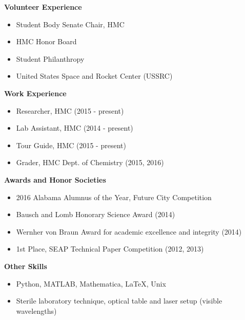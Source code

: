 \documentclass[9pt]{article}
\begin{document}
\begin{multicols*}{2}

\noindent
{\bf Volunteer Experience \\}
\vspace{-8mm}
	\begin{itemize}[leftmargin=3.75mm]
		\setlength{\itemsep}{0pt}
    	\setlength{\parskip}{0pt}
    	\setlength{\parsep}{0pt}
		\item Student Body Senate Chair, HMC
		\item HMC Honor Board
		\item Student Philanthropy
		\item United States Space and Rocket Center (USSRC)
	\end{itemize}

\noindent
{\bf Work Experience \\}
\vspace{-8mm}
	\begin{itemize}[leftmargin=3.75mm]
		\setlength{\itemsep}{0pt}
    	\setlength{\parskip}{0pt}
    	\setlength{\parsep}{0pt}
		\item Researcher, HMC (2015 - present)
		\item Lab Assistant, HMC (2014 - present)
		\item Tour Guide, HMC (2015 - present)
		\item Grader, HMC Dept. of Chemistry (2015, 2016)
	\end{itemize}
	
\vfill
\columnbreak

\noindent
{\bf Awards and Honor Societies \\}
\vspace{-8mm}
	\begin{itemize}[leftmargin=3.75mm]
		\setlength{\itemsep}{0pt}
    	\setlength{\parskip}{0pt}
    	\setlength{\parsep}{0pt}
		\item 2016 Alabama Alumnus of the Year, Future City Competition
		\item Bausch and Lomb Honorary Science Award (2014)
		\item Wernher von Braun Award for academic excellence 
			and integrity (2014)
		\item 1st Place, SEAP Technical Paper Competition (2012, 2013)
	\end{itemize}

\noindent
{\bf Other Skills \\}
\vspace{-8mm}
	\begin{itemize}[leftmargin=3.75mm]
		\setlength{\itemsep}{0pt}
    	\setlength{\parskip}{0pt}
    	\setlength{\parsep}{0pt}
		\item Python, MATLAB, Mathematica, \LaTeX, Unix
		\item Sterile laboratory technique, optical table and laser setup (visible wavelengths)
	\end{itemize}

\end{multicols*}
%
%
\end{document}
